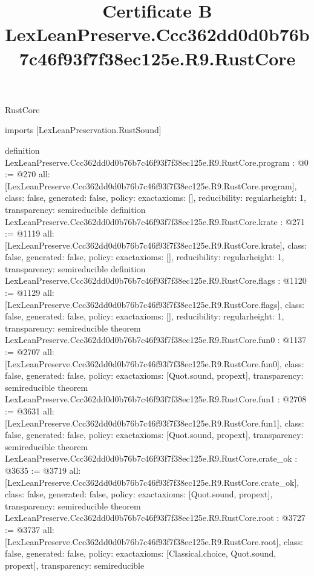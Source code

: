 \begin{lexlean}{RustCore}
\title{Certificate B LexLeanPreserve.Ccc362dd0d0b76b7c46f93f7f38ec125e.R9.RustCore}
\begin{coremodule}
imports [LexLeanPreservation.RustSound]

definition LexLeanPreserve.Ccc362dd0d0b76b7c46f93f7f38ec125e.R9.RustCore.program : @0 := @270 {
  all: [LexLeanPreserve.Ccc362dd0d0b76b7c46f93f7f38ec125e.R9.RustCore.program],
  class: false,
  generated: false,
  policy: exact{axioms: []},
  reducibility: regular{height: 1},
  transparency: semireducible
}
definition LexLeanPreserve.Ccc362dd0d0b76b7c46f93f7f38ec125e.R9.RustCore.krate : @271 := @1119 {
  all: [LexLeanPreserve.Ccc362dd0d0b76b7c46f93f7f38ec125e.R9.RustCore.krate],
  class: false,
  generated: false,
  policy: exact{axioms: []},
  reducibility: regular{height: 1},
  transparency: semireducible
}
definition LexLeanPreserve.Ccc362dd0d0b76b7c46f93f7f38ec125e.R9.RustCore.flags : @1120 := @1129 {
  all: [LexLeanPreserve.Ccc362dd0d0b76b7c46f93f7f38ec125e.R9.RustCore.flags],
  class: false,
  generated: false,
  policy: exact{axioms: []},
  reducibility: regular{height: 1},
  transparency: semireducible
}
theorem LexLeanPreserve.Ccc362dd0d0b76b7c46f93f7f38ec125e.R9.RustCore.fun0 : @1137 := @2707 {
  all: [LexLeanPreserve.Ccc362dd0d0b76b7c46f93f7f38ec125e.R9.RustCore.fun0],
  class: false,
  generated: false,
  policy: exact{axioms: [Quot.sound, propext]},
  transparency: semireducible
}
theorem LexLeanPreserve.Ccc362dd0d0b76b7c46f93f7f38ec125e.R9.RustCore.fun1 : @2708 := @3631 {
  all: [LexLeanPreserve.Ccc362dd0d0b76b7c46f93f7f38ec125e.R9.RustCore.fun1],
  class: false,
  generated: false,
  policy: exact{axioms: [Quot.sound, propext]},
  transparency: semireducible
}
theorem LexLeanPreserve.Ccc362dd0d0b76b7c46f93f7f38ec125e.R9.RustCore.crate_ok : @3635 := @3719 {
  all: [LexLeanPreserve.Ccc362dd0d0b76b7c46f93f7f38ec125e.R9.RustCore.crate_ok],
  class: false,
  generated: false,
  policy: exact{axioms: [Quot.sound, propext]},
  transparency: semireducible
}
theorem LexLeanPreserve.Ccc362dd0d0b76b7c46f93f7f38ec125e.R9.RustCore.root : @3727 := @3737 {
  all: [LexLeanPreserve.Ccc362dd0d0b76b7c46f93f7f38ec125e.R9.RustCore.root],
  class: false,
  generated: false,
  policy: exact{axioms: [Classical.choice, Quot.sound, propext]},
  transparency: semireducible
}


\end{coremodule}
\end{lexlean}
